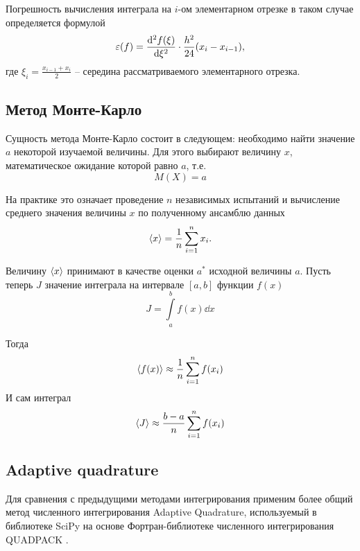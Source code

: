Погрешность  вычисления интеграла на $i$-ом элементарном отрезке в таком случае определяется формулой
\begin{equation}
    \label{eq:}
    \varepsilon(f) = \dv[2]{f(\xi)}{\xi} \cdot \frac{h^2}{24}(x_i - x_{i-1}),
\end{equation}
где $\xi_i = \frac{x_{i-1} + x_i}{2}$ -- середина рассматриваемого элементарного
отрезка.

\subsection{Метод Монте-Карло}%
\label{sub:metod_monte_karlo}

Сущность метода Монте-Карло состоит в следующем: необходимо найти значение $a$
некоторой изучаемой величины. Для этого выбирают величину  $x$, математическое
ожидание которой равно  $a$, т.е.
 \begin{equation}
    \label{eq:}
    M(X) = a
\end{equation}

На практике это означает проведение $n$ независимых испытаний и вычисление
среднего значения величины $x$ по полученному ансамблю данных
\begin{equation}
    \label{eq:}
    \langle x\rangle = \frac{1}{n} \sum\limits_{i=1}^{n} x_i.
\end{equation}

Величину $\langle x\rangle$ принимают в качестве оценки  $a^*$ исходной величины  $a$.
Пусть теперь $J$ значение интеграла на интервале  $[a,b]$ функции $f(x)$
 \begin{equation}
    \label{eq:}
    J = \int\limits_{a}^{b}  f(x) \dd x
\end{equation}

Тогда
\begin{equation}
    \label{eq:}
    \langle f(x)\rangle \approx \frac{1}{n} \sum\limits_{i=1}^{n} f(x_i)
\end{equation}
И сам интеграл
\begin{equation}
    \label{eq:}
    \langle J\rangle \approx \frac{b-a}{n} \sum\limits_{i=1}^{n} f(x_i)
\end{equation}



\subsection{Adaptive quadrature}%
\label{sub:adaptive_quadrature}


Для сравнения с предыдущими методами интегрирования применим более общий метод
численного интегрирования Adaptive Quadrature, используемый в библиотеке SciPy
\cite{SciPy} на основе Фортран-библиотеке численного интегрирования QUADPACK
\cite{QuadPack}.

